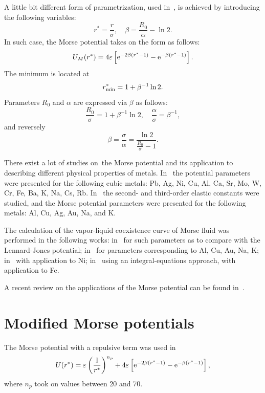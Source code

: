\documentclass[12pt]{article}
\begin{document}
	A little bit different form of parametrization, used in~\cite{MartinezValenciaEtAl2013}, is achieved by introducing the following variables:
	\begin{equation}
		r^* = \frac{r}{\sigma}, \quad \beta = \frac{R_0}{\alpha} - \ln2.
	\end{equation}
	In such case, the Morse potential takes on the form as follows:
	\begin{equation}
		U_M(r^*) = 4\varepsilon\left[{\rm e}^{-2\beta(r^* - 1)} - {\rm e}^{-\beta(r^* - 1)}\right].
	\end{equation}
	The minimum is located at
	\begin{equation}
		r^*_{\rm min} = 1 + \beta^{-1} \ln2.
	\end{equation}
	Parameters $R_0$ and $\alpha$ are expressed via $\beta$ as follows:
	\begin{equation}
		\frac{R_0}{\sigma} = 1 + \beta^{-1} \ln2, \quad \frac{\alpha}{\sigma} = \beta^{-1},
	\end{equation}
	and reversely
	\begin{equation}
		\beta = \frac{\sigma}{\alpha} = \frac{\ln2}{\frac{R_0}{\sigma} - 1}.
	\end{equation}
	
	There exist a lot of studies on\ the Morse potential and its application to describing different physical properties of metals. In~\cite{GirifalcoWeizer1959} the potential parameters were presented for the following cubic metals: Pb, Ag, Ni, Cu, Al, Ca, Sr, Mo, W, Cr, Fe, Ba, K, Na, Cs, Rb. In~\cite{LincolnKoliwadGhate1967} the second- and third-order elastic constants were studied, and the Morse potential parameters were presented for the following metals: Al, Cu, Ag, Au, Na, and K. 
	
	The calculation of the vapor-liquid coexistence curve of Morse fluid was performed in the following works: in~\cite{OkumuraYonezawa2000} for such parameters as to compare with the Lennard-Jones potential; in~\cite{SinghAdhikariKwak2006,KwakSinghAdhikari2007} for parameters corresponding to Al, Cu, Au, Na, K; in~\cite{ChengXu2007} with application to Ni; in~\cite{Apfelbaum2011} using an integral-equations approach, with application to Fe.
	
	A recent review on the applications of the Morse potential can be found in~\cite{JacobsonThompson2022}.
	
	\section{Modified Morse potentials}
	The Morse potential with a repulsive term was used in~\cite{MartinezValenciaEtAl2013}
	\begin{equation}
		U(r^*) = \varepsilon\left(\frac{1}{r^*}\right)^{n_p} + 4\varepsilon\left[{\rm e}^{-2\beta(r^* - 1)} - {\rm e}^{-\beta(r^* - 1)}\right],
	\end{equation}
	where $n_p$ took on values between 20 and 70.
	
\end{document}
